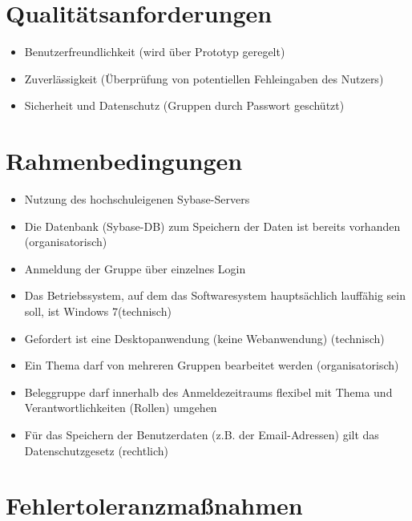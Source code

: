 \documentclass{article}
\begin{document}

\newpage
\part{Qualitätsanforderungen}
\begin{itemize}
\item Benutzerfreundlichkeit (wird über Prototyp geregelt)
\item Zuverlässigkeit (Überprüfung von potentiellen Fehleingaben des Nutzers)
\item Sicherheit und Datenschutz (Gruppen durch Passwort geschützt)
\end{itemize}

\newpage
\part{Rahmenbedingungen}
\begin{itemize}
\item Nutzung des hochschuleigenen Sybase-Servers
\item Die Datenbank (Sybase-DB) zum Speichern der Daten ist bereits vorhanden
(organisatorisch)
\item Anmeldung der Gruppe über einzelnes Login
\item Das Betriebssystem, auf dem das Softwaresystem hauptsächlich lauffähig
sein soll, ist Windows 7(technisch)
\item Gefordert ist eine Desktopanwendung (keine Webanwendung) (technisch)
\item Ein Thema darf von mehreren Gruppen bearbeitet werden (organisatorisch)
\item Beleggruppe darf innerhalb des Anmeldezeitraums flexibel mit Thema und Verantwortlichkeiten (Rollen) umgehen
\item Für das Speichern der Benutzerdaten (z.B. der Email-Adressen) gilt das
Datenschutzgesetz (rechtlich)
\end{itemize}

\newpage
\part{Fehlertoleranzmaßnahmen}
\end{document}
